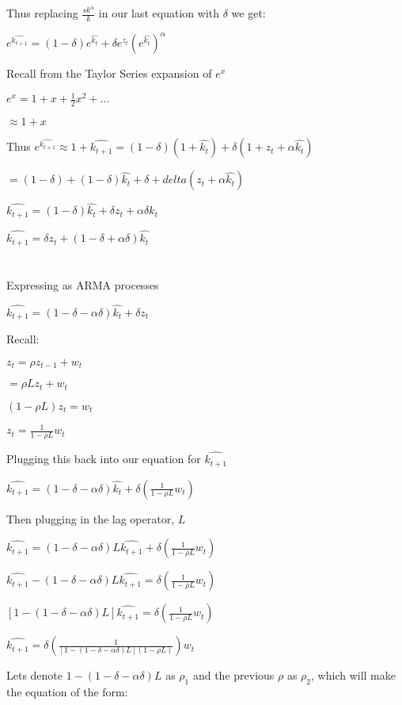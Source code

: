 \documentclass[11pt, oneside]{article}   	%
\begin{document}
Thus replacing $\frac{sk^\alpha}{k}$ in our last equation with $\delta$ we get:

$e^{\widehat{k_{t+1}}} = (1-\delta)e^{\hat{k_t}} + \delta e^{z_t}(e^{\hat{k_t}})^\alpha$

Recall from the Taylor Series expansion of $e^x$

$e^x = 1 + x + \frac{1}{2}x^2 + ...$

$ \approx 1+x$

Thus $e^{\widehat{k_{t+1}}} \approx 1+\widehat{k_{t+1}} = (1-\delta)(1+\hat{k_t}) + \delta (1+z_t+\alpha \hat{k_t})$

$=(1-\delta) + (1-\delta)\hat{k_t} + \delta + delta(z_t + \alpha \hat{k_t})$

$\widehat{k_{t+1}} = (1-\delta)\hat{k_t} + \delta z_t + \alpha \delta \hat{k_t}$

$\widehat{k_{t+1}} = \delta z_t + (1-\delta+\alpha \delta)\hat{k_t}$

\section{}

Expressing as ARMA processes

$\widehat{k_{t+1}} = (1-\delta-\alpha \delta)\hat{k_t} + \delta z_t$

Recall:

$z_t = \rho z_{t-1} + w_t$

$=\rho L z_t + w_t$

$(1-\rho L)z_t = w_t$

$z_t = \frac{1}{1-\rho L}w_t$

Plugging this back into our equation for $\widehat{k_{t+1}}$

$\widehat{k_{t+1}} = (1-\delta-\alpha \delta)\hat{k_t} + \delta(\frac{1}{1-\rho L}w_t)$

Then plugging in the lag operator, $L$

$\widehat{k_{t+1}} = (1-\delta-\alpha \delta)L \widehat{k_{t+1}} + \delta(\frac{1}{1-\rho L}w_t)$

$\widehat{k_{t+1}} -  (1-\delta-\alpha \delta)L \widehat{k_{t+1}} = \delta(\frac{1}{1-\rho L}w_t)$

$[1-(1-\delta-\alpha \delta)L] \widehat{k_{t+1}} = \delta(\frac{1}{1-\rho L}w_t)$

$\widehat{k_{t+1}} = \delta(\frac{1}{[1-(1-\delta-\alpha \delta)L] (1-\rho L)})w_t$

Lets denote $1-(1-\delta-\alpha \delta)L$ as $\rho_1$ and the previous $\rho$ as $\rho_2$, which will make the equation of the form:
\end{document}

